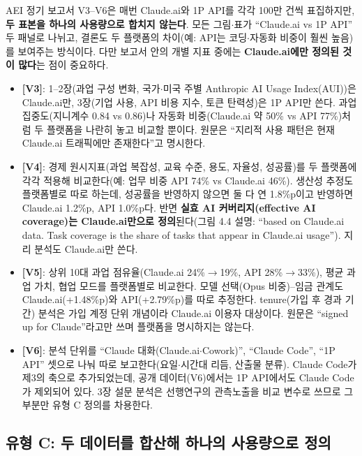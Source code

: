 \documentclass[11pt]{article}
\begin{document}
AEI 정기 보고서 V3--V6은 매번 Claude.ai와 1P API를 각각 100만 건씩 표집하지만, \textbf{두 표본을 하나의 사용량으로 합치지 않는다}. 모든 그림$\cdot$표가 ``Claude.ai vs 1P API'' 두 패널로 나뉘고, 결론도 두 플랫폼의 차이(예: API는 코딩$\cdot$자동화 비중이 훨씬 높음)를 보여주는 방식이다. 다만 보고서 안의 개별 지표 중에는 \textbf{Claude.ai에만 정의된 것이 많다}는 점이 중요하다.

\begin{itemize}
  \item \textbf{\textcite{appel-2025-uneven-geographic-and-enterprise-ai} [V3]}: 1--2장(과업 구성 변화, 국가$\cdot$미국 주별 Anthropic AI Usage Index(AUI))은 Claude.ai만, 3장(기업 사용, API 비용 지수, 토큰 탄력성)은 1P API만 쓴다. 과업 집중도(지니계수 0.84 vs 0.86)나 자동화 비중(Claude.ai 약 50\% vs API 77\%)처럼 두 플랫폼을 나란히 놓고 비교할 뿐이다. 원문은 ``지리적 사용 패턴은 현재 Claude.ai 트래픽에만 존재한다''고 명시한다.
  \item \textbf{\textcite{appel-2026-economic-primitives} [V4]}: 경제 원시지표(과업 복잡성, 교육 수준, 용도, 자율성, 성공률)를 두 플랫폼에 각각 적용해 비교한다(예: 업무 비중 API 74\% vs Claude.ai 46\%). 생산성 추정도 플랫폼별로 따로 하는데, 성공률을 반영하지 않으면 둘 다 연 1.8\%p이고 반영하면 Claude.ai 1.2\%p, API 1.0\%p다. 반면 \textbf{실효 AI 커버리지(effective AI coverage)는 Claude.ai만으로 정의}된다(그림 4.4 설명: ``based on Claude.ai data. Task coverage is the share of tasks that appear in Claude.ai usage''). 지리 분석도 Claude.ai만 쓴다.
  \item \textbf{\textcite{massenkoff-2026-learning-curves} [V5]}: 상위 10대 과업 점유율(Claude.ai 24\%$\to$19\%, API 28\%$\to$33\%), 평균 과업 가치, 협업 모드를 플랫폼별로 비교한다. 모델 선택(Opus 비중)--임금 관계도 Claude.ai(+1.48\%p)와 API(+2.79\%p)를 따로 추정한다. tenure(가입 후 경과 기간) 분석은 가입 계정 단위 개념이라 Claude.ai 이용자 대상이다. 원문은 ``signed up for Claude''라고만 쓰며 플랫폼을 명시하지는 않는다.
  \item \textbf{\textcite{massenkoff-2026-cadences} [V6]}: 분석 단위를 ``Claude 대화(Claude.ai$\cdot$Cowork)'', ``Claude Code'', ``1P API'' 셋으로 나눠 따로 보고한다(요일$\cdot$시간대 리듬, 산출물 분류). Claude Code가 제3의 축으로 추가되었는데, 공개 데이터(V6)에서는 1P API에서도 Claude Code가 제외되어 있다. 3장 설문 분석은 선행연구의 관측노출을 비교 변수로 쓰므로 그 부분만 유형 C 정의를 차용한다.
\end{itemize}

\subsection{유형 C: 두 데이터를 합산해 하나의 사용량으로 정의}
\label{sec:typeC}
\end{document}
